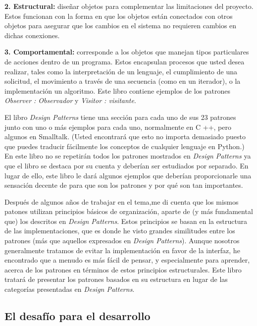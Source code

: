 \textbf{2. Estructural:} diseñar objetos para complementar las limitaciones del proyecto. Estos funcionan con la forma en que los objetos están conectados con otros objetos para asegurar que los cambios en el sistema no requieren cambios en dichas conexiones.        \newline

\textbf{3. Comportamental:} corresponde a los objetos que manejan tipos particulares de acciones dentro de un programa. Estos encapsulan procesos que usted desea realizar, tales como la interpretación de un lenguaje, el cumplimiento de una solicitud, el movimiento a través de una secuencia (como en un iterador), o la implementación un algoritmo. Este libro contiene ejemplos de los patrones \textit{Observer : Observador} y \textit{Visitor : visitante}. \newline

El libro \textit{Design Patterns} tiene una sección para cada uno de sus 23 patrones junto con uno o más ejemplos para cada uno, normalmente en C ++, pero algunos en Smalltalk. (Usted encontrará que esto no importa demasiado puesto que puedes traducir fácilmente los conceptos de cualquier lenguaje en Python.) En este libro no se repetirán todos los patrones mostrados en \textit{Design Patterns} ya que el libro se destaca por su cuenta y deberían ser estudiados por separado. En lugar de ello, este libro le dará algunos ejemplos que deberían proporcionarle una sensación decente de para que son los patrones y por qué son tan importantes. \newline

Después de algunos años de trabajar en el tema,me di cuenta que los mismos patones utilizan principios básicos de organización, aparte de (y más fundamental que) los descritos en \textit{Design Patterns}. Estos principios se basan en la estructura de las implementaciones, que es donde he visto grandes similitudes entre los patrones (más que aquellos expresados en \textit{Design Patterns}). Aunque nosotros generalmente tratamos de evitar la implementación en favor de la interfaz, he encontrado que a menudo es más fácil de pensar, y especialmente para aprender, acerca de los patrones en términos de estos principios estructurales. Este libro tratará de presentar los patrones basados en su estructura en lugar de las categorías presentadas en \textit{Design Patterns}.         \newline

\subsection*{El desafío para el desarrollo}
\label{subsec:edped}

